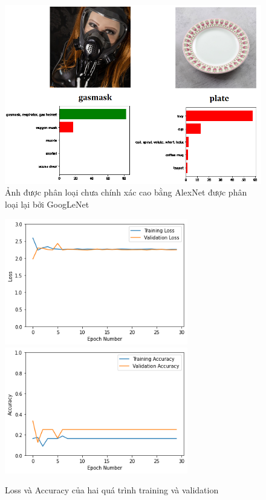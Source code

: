 \documentclass[a4paper]{article}
\begin{document}
\begin{figure}[h!]
\centering
\includegraphics[width=15cm]{images/res3.PNG}
\caption*{Ảnh được phân loại chưa chính xác cao bằng AlexNet được phân loại lại bởi GoogLeNet}
\end{figure}

\clearpage

\begin{figure}[h!]
\centering
{{\includegraphics[width=8cm]{images/loss.png} }}
\qquad
{{\includegraphics[width=8cm]{images/acc.png} }}
\caption*{Loss và Accuracy của hai quá trình training và validation}
\end{figure}
\end{document}
